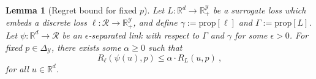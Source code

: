 \documentclass[12pt]{article}
\newcommand{\reals}{\mathbb{R}}
\newcommand{\prop}[1]{\mathrm{prop}[#1]}
\newcommand{\simplex}{\Delta_\Y}
\newcommand{\R}{\mathcal{R}}
\newcommand{\Y}{\mathcal{Y}}
\newcommand{\risk}[1]{\underline{#1}}
\newcommand{\inprod}[2]{\langle #1, #2 \rangle}%
\newcommand{\regret}[3]{R_{#1}(#2,#3)}
\newtheorem{lemma}{Lemma}
\begin{document}
\begin{lemma}[Regret bound for fixed $p$]
  \label{lem:regret-bound-fixed-p}
  Let $L:\reals^d \to \reals^\Y_+$ be a surrogate loss which embeds a discrete loss $\ell:\R\to\reals^\Y_+$, and define $\gamma := \prop{\ell}$ and $\Gamma := \prop{L}$.
  Let $\psi:\reals^d\to\R$ be an $\epsilon$-separated link with respect to $\Gamma$ and $\gamma$ for some $\epsilon>0$.
  For fixed $p\in\simplex$, there exists some $\alpha\geq 0$ such that
  \begin{equation}
    \label{eq:surrogate-regret-bound-fixed}
    \regret{\ell}{\psi(u)}{p}
    \leq
    \alpha \cdot \regret{L}{u}{p}~,
  \end{equation}
  for all $u\in\reals^d$.
\end{lemma}
\end{document}
